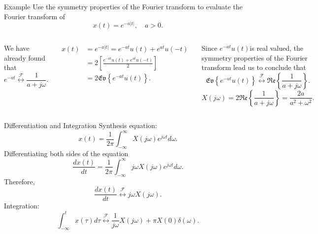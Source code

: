 \begin{frame}{Example}
    Use the symmetry properties of the Fourier transform to evaluate the Fourier transform of
    \begin{equation*}
        x(t) = e^{-a|t|}, \quad a>0.
    \end{equation*}
    \pause
    \begin{columns}
            We have already found that
            \begin{equation*}
                e^{-at} \overset{\mathcal{F}}{\longleftrightarrow} \frac{1}{a+j\omega}.
            \end{equation*}

            \begin{align*}
                x(t) &= e^{-a|t|} = e^{-at}u(t) + e^{at}u(-t)\\
                &= 2\left[\frac{e^{-at}u(t) + e^{at}u(-t)}{2}\right]\\
                &= 2\mathfrak{Ev}\left\{ e^{-at}u(t)\right\}.
            \end{align*}

            Since $e^{-at}u(t)$is real valued, the symmetry properties of the Fourier transform lead us to conclude that
            \begin{equation*}
                \mathfrak{Ev}\left\{ e^{-at}u(t)\right\} \overset{\mathcal{F}}{\longleftrightarrow} \mathfrak{Re}\left\{ \frac{1}{a+j\omega}\right\}.
            \end{equation*}
            \pause
            \begin{equation*}
                X(j\omega) = 2\mathfrak{Re}\left\{ \frac{1}{a+j\omega}\right\} = \frac{2a}{a^2 + \omega^2}.
            \end{equation*}
    \end{columns}
\end{frame}


\begin{frame}{Differentiation and Integration}
    Synthesis equation:
    \begin{equation*}
        x(t) = \frac{1}{2\pi}\int_{-\infty}^{\infty}X(j\omega)e^{j\omega t} d\omega.
    \end{equation*}
    Differentiating both  sides of the equation
    \begin{equation*}
        \frac{dx(t)}{dt} = \frac{1}{2\pi}\int_{-\infty}^{\infty}j\omega X(j\omega)e^{j\omega t} d\omega.
    \end{equation*}
    Therefore,
    \begin{equation*}
        \frac{dx(t)}{dt}  \overset{\mathcal{F}}{\longleftrightarrow}  j\omega X(j\omega).
    \end{equation*}
    Integration:
    \begin{equation*}
        \int_{-\infty}^{t} x(\tau)d\tau \overset{\mathcal{F}}{\longleftrightarrow} \frac{1}{ j\omega} X(j\omega) + \pi X(0)\delta(\omega).
    \end{equation*}
\end{frame}


